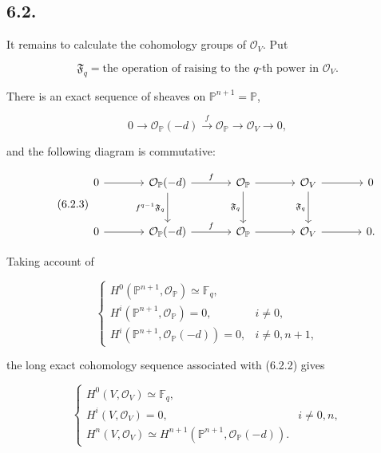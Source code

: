 \subsection*{6.2.}
It remains to calculate the cohomology groups of $\mathcal O_V$.
Put

\begin{equation}\tag{6.2.1}
\mathfrak F_q
=\text{the operation of raising to the $q$-th power in $\mathcal O_V$}.
\end{equation}

There is an exact sequence of sheaves on
$\mathbb P^{n+1}=\mathbb P$,

\begin{equation}\tag{6.2.2}
0\longrightarrow\mathcal O_{\mathbb P}(-d)
\xrightarrow{\,f\,}\mathcal O_{\mathbb P}
\longrightarrow\mathcal O_V\longrightarrow0,
\end{equation}

and the following diagram is commutative:

\begin{equation}\tag{6.2.3}
\begin{tikzcd}[column sep=large,row sep=large]
0 \arrow[r] &
\mathcal O_{\mathbb P}(-d) \arrow[r,"f"] \arrow[d,"f^{q-1}\mathfrak F_q"'] &
\mathcal O_{\mathbb P} \arrow[r] \arrow[d,"\mathfrak F_q"'] &
\mathcal O_V \arrow[r] \arrow[d,"\mathfrak F_q"'] &
0\\
0 \arrow[r] &
\mathcal O_{\mathbb P}(-d) \arrow[r,"f"] &
\mathcal O_{\mathbb P} \arrow[r] &
\mathcal O_V \arrow[r] &
0 .
\end{tikzcd}
\end{equation}

Taking account of

\begin{equation}\tag{6.2.4}
\begin{cases}
H^0(\mathbb P^{n+1},\mathcal O_{\mathbb P})\simeq\mathbb F_q,\\
H^i(\mathbb P^{n+1},\mathcal O_{\mathbb P})=0,
&i\ne0,\\
H^i(\mathbb P^{n+1},\mathcal O_{\mathbb P}(-d))=0,
&i\ne0,n+1,
\end{cases}
\end{equation}

the long exact cohomology sequence associated with (6.2.2) gives

\begin{equation}\tag{6.2.5}
\begin{cases}
H^0(V,\mathcal O_V)\simeq\mathbb F_q,\\
H^i(V,\mathcal O_V)=0,&i\ne0,n,\\
H^n(V,\mathcal O_V)
\simeq H^{n+1}(\mathbb P^{n+1},\mathcal O_{\mathbb P}(-d)).
\end{cases}
\end{equation}

